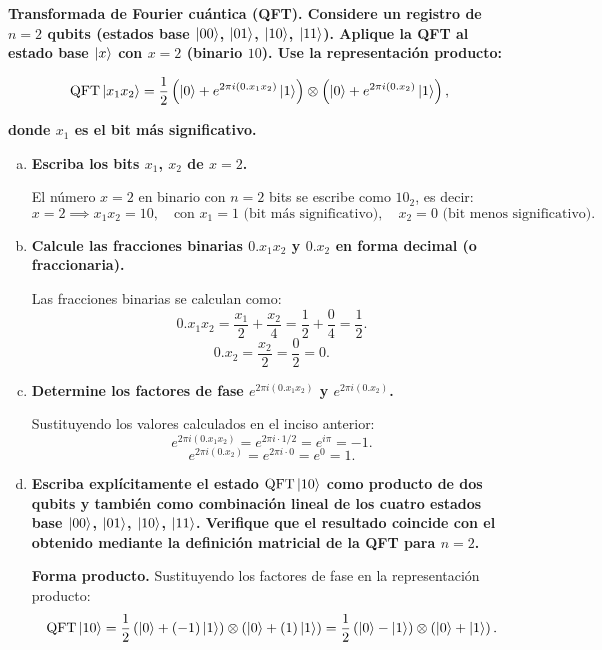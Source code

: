 {\bfseries Transformada de Fourier cuántica (QFT). Considere un registro de $n = 2$ qubits (estados base $\ket{00}$, $\ket{01}$, $\ket{10}$, $\ket{11}$). Aplique la QFT al estado base $\ket{x}$ con $x = 2$ (binario $10$). Use la representación producto:}

\[
	\text{QFT}\ket{x_1 x_2} = \frac{1}{2}\left(\ket{0} + e^{2\pi i(0.x_1 x_2)}\ket{1}\right) \otimes \left(\ket{0} + e^{2\pi i(0.x_2)}\ket{1}\right),
\]

{\bfseries donde $x_1$ es el bit más significativo.}

\begin{enumerate}[a)]
	\item {\bfseries Escriba los bits $x_1$, $x_2$ de $x = 2$.}

	      El número $x = 2$ en binario con $n = 2$ bits se escribe como $10_2$, es decir:
	      \[
		      x = 2 \implies x_1 x_2 = 10, \quad \text{con } x_1 = 1 \text{ (bit más significativo)}, \quad x_2 = 0 \text{ (bit menos significativo)}.
	      \]

	\item {\bfseries Calcule las fracciones binarias $0.x_1 x_2$ y $0.x_2$ en forma decimal (o fraccionaria).}

	      Las fracciones binarias se calculan como:
	      \[
		      0.x_1 x_2 = \frac{x_1}{2} + \frac{x_2}{4} = \frac{1}{2} + \frac{0}{4} = \frac{1}{2}.
	      \]
	      \[
		      0.x_2 = \frac{x_2}{2} = \frac{0}{2} = 0.
	      \]

	\item {\bfseries Determine los factores de fase $e^{2\pi i(0.x_1 x_2)}$ y $e^{2\pi i(0.x_2)}$.}

	      Sustituyendo los valores calculados en el inciso anterior:
	      \[
		      e^{2\pi i(0.x_1 x_2)} = e^{2\pi i \cdot 1/2} = e^{i\pi} = -1.
	      \]
	      \[
		      e^{2\pi i(0.x_2)} = e^{2\pi i \cdot 0} = e^0 = 1.
	      \]

	\item {\bfseries Escriba explícitamente el estado $\text{QFT}\ket{10}$ como producto de dos qubits y también como combinación lineal de los cuatro estados base $\ket{00}$, $\ket{01}$, $\ket{10}$, $\ket{11}$. Verifique que el resultado coincide con el obtenido mediante la definición matricial de la QFT para $n = 2$.}

	      \textbf{Forma producto.} Sustituyendo los factores de fase en la representación producto:
	      \[
		      \text{QFT}\ket{10} = \frac{1}{2}\left(\ket{0} + (-1)\ket{1}\right) \otimes \left(\ket{0} + (1)\ket{1}\right) = \frac{1}{2}\left(\ket{0} - \ket{1}\right) \otimes \left(\ket{0} + \ket{1}\right).
	      \]


\end{enumerate}

